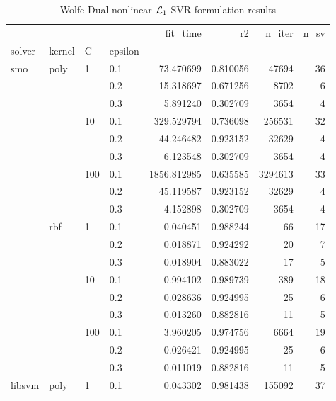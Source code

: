 \begin{table}[H]
\centering
\caption{Wolfe Dual nonlinear $\protect \mathcal{L}_1$-SVR formulation results}
\label{nonlinear_dual_l1_svr_cv_results}
\begin{tabular}{llllrrrr}
\toprule
       &     &     &     &     fit\_time &        r2 &    n\_iter &  n\_sv \\
solver & kernel & C & epsilon &              &           &           &       \\
\midrule
smo & poly & 1   & 0.1 &    73.470699 &  0.810056 &     47694 &    36 \\
       &     &     & 0.2 &    15.318697 &  0.671256 &      8702 &     6 \\
       &     &     & 0.3 &     5.891240 &  0.302709 &      3654 &     4 \\
       &     & 10  & 0.1 &   329.529794 &  0.736098 &    256531 &    32 \\
       &     &     & 0.2 &    44.246482 &  0.923152 &     32629 &     4 \\
       &     &     & 0.3 &     6.123548 &  0.302709 &      3654 &     4 \\
       &     & 100 & 0.1 &  1856.812985 &  0.635585 &   3294613 &    33 \\
       &     &     & 0.2 &    45.119587 &  0.923152 &     32629 &     4 \\
       &     &     & 0.3 &     4.152898 &  0.302709 &      3654 &     4 \\
       & rbf & 1   & 0.1 &     0.040451 &  0.988244 &        66 &    17 \\
       &     &     & 0.2 &     0.018871 &  0.924292 &        20 &     7 \\
       &     &     & 0.3 &     0.018904 &  0.883022 &        17 &     5 \\
       &     & 10  & 0.1 &     0.994102 &  0.989739 &       389 &    18 \\
       &     &     & 0.2 &     0.028636 &  0.924995 &        25 &     6 \\
       &     &     & 0.3 &     0.013260 &  0.882816 &        11 &     5 \\
       &     & 100 & 0.1 &     3.960205 &  0.974756 &      6664 &    19 \\
       &     &     & 0.2 &     0.026421 &  0.924995 &        25 &     6 \\
       &     &     & 0.3 &     0.011019 &  0.882816 &        11 &     5 \\
libsvm & poly & 1   & 0.1 &     0.043302 &  0.981438 &    155092 &    37 \\

\end{tabular}
\end{table}

